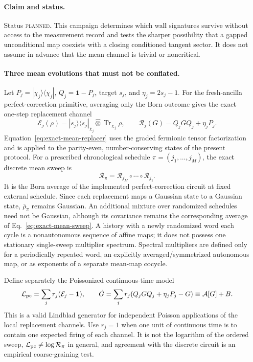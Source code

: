 \documentclass[aps,prx,twocolumn,floatfix,nofootinbib,superscriptaddress,longbibliography]{revtex4-2}
\newcommand{\qTr}{\operatorname{Tr}}
\newcommand{\planned}{\textsc{planned}}
\begin{document}
\paragraph*{Claim and status.}
Status \planned.  This campaign determines which wall signatures survive without access to
the measurement record and tests the sharper possibility that a gapped unconditional map
coexists with a closing conditioned tangent sector.  It does not assume in advance that
the mean channel is trivial or noncritical.

\paragraph*{Three mean evolutions that must not be conflated.}
Let $P_j=|\chi_j\rangle\langle\chi_j|$, $Q_j=\mathbf{1}-P_j$, target $s_j$, and
$\eta_j=2s_j-1$.  For the fresh-ancilla perfect-correction primitive, averaging only the
Born outcome gives the exact one-step replacement channel
\begin{equation}
 \mathcal E_j(\rho)
 =|s_j\rangle\!\langle s_j|_{\chi_j}\widehat\otimes\qTr_{\chi_j}\rho,
 \qquad
\mathcal R_j(G)=Q_jGQ_j+\eta_jP_j .
\label{eq:exact-mean-replacer}
\end{equation}
Equation~\eqref{eq:exact-mean-replacer} uses the graded fermionic tensor factorization and
is applied to the parity-even, number-conserving states of the present protocol.
For a prescribed chronological schedule $\pi=(j_1,\ldots,j_M)$, the exact discrete mean
sweep is
\begin{equation}
 \mathcal R_\pi
 =\mathcal R_{j_M}\circ\cdots\circ\mathcal R_{j_1}.
 \label{eq:exact-mean-sweep}
\end{equation}
It is the Born average of the implemented perfect-correction circuit at fixed external
schedule.  Since each replacement maps a Gaussian state to a Gaussian state,
$\bar\rho_\pi$ remains Gaussian.  An additional mixture over randomized schedules need not
be Gaussian, although its covariance remains the corresponding average of
Eq.~\eqref{eq:exact-mean-sweep}.  A history with a newly randomized word each cycle is a
nonautonomous sequence of affine maps; it does not possess one stationary single-sweep
multiplier spectrum.  Spectral multipliers are defined only for a periodically repeated
word, an explicitly averaged/symmetrized autonomous map, or as exponents of a separate
mean-map cocycle.

Define separately the Poissonized continuous-time model
\begin{equation}
 \mathcal L_{\rm pc}=\sum_j r_j(\mathcal E_j-\mathbf{1}),
 \qquad
 \dot G=\sum_jr_j\!\left(Q_jGQ_j+\eta_jP_j-G\right)
       \equiv\mathcal A[G]+B .
 \label{eq:poisson-perfect-correction}
\end{equation}
This is a valid Lindblad generator for independent Poisson applications of the local
replacement channels.  Use $r_j=1$ when one unit of continuous time is to contain one
expected firing of each channel.  It is not the logarithm of the ordered sweep,
$\mathcal L_{\rm pc}\ne\log\mathcal R_\pi$ in general, and agreement with the discrete
circuit is an empirical coarse-graining test.
\end{document}
